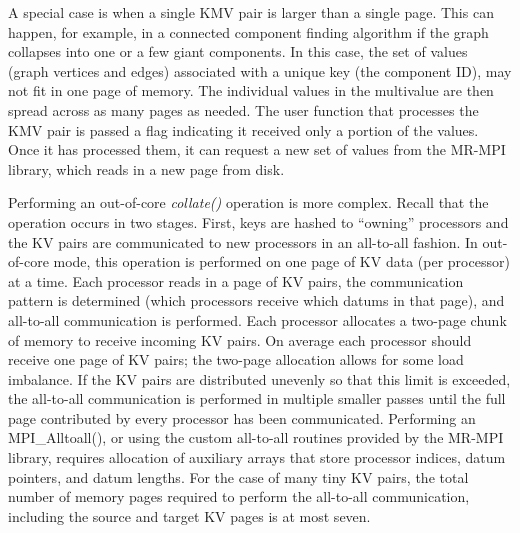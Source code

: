 A special case is when a single KMV pair is larger than a single page.
This can happen, for example, in a connected component finding
algorithm if the graph collapses into one or a few giant components.
In this case, the set of values (graph vertices and edges) associated
with a unique key (the component ID), may not fit in one page of
memory.  The individual values in the multivalue are then spread
across as many pages as needed.  The user function that processes the
KMV pair is passed a flag indicating it received only a portion of the
values.  Once it has processed them, it can request a new set of
values from the MR-MPI library, which reads in a new page from disk.

Performing an out-of-core {\it collate()} operation is more complex.
Recall that the operation occurs in two stages.  First, keys are
hashed to ``owning'' processors and the KV pairs are communicated to
new processors in an all-to-all fashion.  In out-of-core mode, this
operation is performed on one page of KV data (per processor) at a
time.  Each processor reads in a page of KV pairs, the communication
pattern is determined (which processors receive which datums in that
page), and all-to-all communication is performed.  Each processor
allocates a two-page chunk of memory to receive incoming KV pairs.  On
average each processor should receive one page of KV pairs; the
two-page allocation allows for some load imbalance.  If the KV pairs
are distributed unevenly so that this limit is exceeded, the
all-to-all communication is performed in multiple smaller passes
until the full page contributed by every processor has been
communicated.  Performing an MPI\_Alltoall(), or using the custom
all-to-all routines provided by the MR-MPI library, requires
allocation of auxiliary arrays that store processor indices, datum
pointers, and datum lengths.  For the case of many tiny KV pairs, the
total number of memory pages required to perform the all-to-all
communication, including the source and target KV pages is at most
seven.


